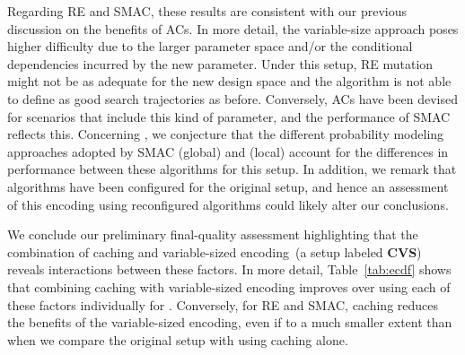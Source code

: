 Regarding RE and SMAC, these results are consistent with our previous discussion on the benefits of ACs. In more detail, the variable-size approach poses higher difficulty due to the larger parameter space and/or the conditional dependencies incurred by the new parameter. Under this setup, RE mutation might not be as adequate for the new design space and the algorithm is not able to define as good search trajectories as before. Conversely, ACs have been devised for scenarios that include this kind of parameter, and the performance of SMAC reflects this. Concerning \irace, we conjecture that the different probability modeling approaches adopted by SMAC (global) and \irace (local) account for the differences in performance between these algorithms for this setup. In addition, we remark that algorithms have been configured for the original setup, and hence an assessment of this encoding using reconfigured algorithms could likely alter our conclusions.

We conclude our preliminary final-quality assessment highlighting that the combination of caching and variable-sized encoding~(a setup labeled \textbf{CVS}) reveals interactions between these factors. In more detail, Table~\ref{tab:ecdf} shows that combining caching with variable-sized encoding improves over using each of these factors individually for \irace. Conversely, for RE and SMAC, caching reduces the benefits of the variable-sized encoding, even if to a much smaller extent than when we compare the original setup with using caching alone.

